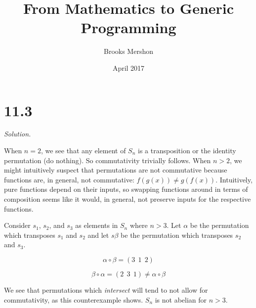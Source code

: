 \documentclass{article}
\title{From Mathematics to Generic Programming}
\author{Brooks Mershon}
\date{April 2017}
\begin{document}
\maketitle

\section*{11.3}


\textit{Solution.}

\bigskip

When $n = 2$, we see that any element of $S_n$ is a transposition or the identity permutation  (do nothing). So commutativity trivially follows. When $n > 2$, we might intuitively suspect that permutations are not commutative because functions are, in general, not commutative: $f(g(x)) \neq g(f(x))$. Intuitively, pure functions depend on their inputs, so swapping functions around in terms of composition seems like it would, in general, not preserve inputs for the respective functions. 

Consider $s_1$, $s_2$, and $s_3$ as elements in $S_n$ where $n > 3$. Let $\alpha$ be the permutation which transposes $s_1$ and $s_2$ and let $s\beta$ be the permutation which transposes $s_2$ and $s_3$.

$$\alpha \circ \beta = (3\ \ 1\ \ 2)$$

$$\beta \circ \alpha = (2\ \ 3\ \ 1) \neq \alpha \circ \beta$$

We see that permutations which \textit{intersect} will tend to not allow for commutativity, as this counterexample shows. $S_n$ is not abelian for $n > 3$.
\end{document}
